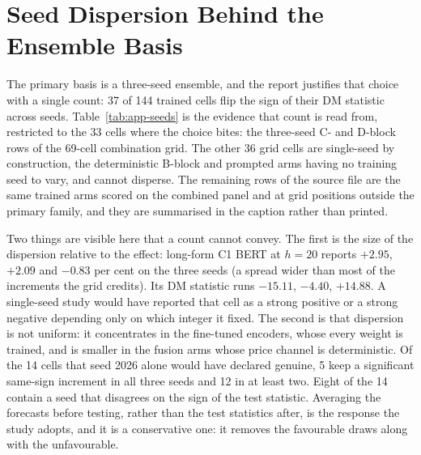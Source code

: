 \clearpage
\FloatBarrier
\section{Seed Dispersion Behind the Ensemble Basis}
\label{app:res-seeds}

The primary basis is a three-seed ensemble, and the report justifies that
choice with a single count: 37 of 144 trained cells flip the sign of their
DM statistic across seeds. Table~\ref{tab:app-seeds} is the evidence that
count is read from, restricted to the 33 cells where the choice bites:
the three-seed C- and D-block rows of the 69-cell combination grid. The
other 36 grid cells are single-seed by construction, the deterministic B-block and
prompted arms having no training seed to vary, and cannot disperse. The
remaining rows of the source file are the same trained arms scored on the
combined panel and at grid positions outside the primary family, and they
are summarised in the caption rather than printed.

Two things are visible here that a count cannot convey. The first is the
size of the dispersion relative to the effect: long-form C1 BERT at
$h{=}20$ reports $+2.95$, $+2.09$ and $-0.83$ per cent on the three seeds
(a spread wider than most of the increments the grid credits). Its
DM statistic runs $-15.11$, $-4.40$, $+14.88$. A single-seed study would
have reported that cell as a strong positive or a strong negative depending
only on which integer it fixed. The second is that dispersion is not
uniform: it concentrates in the fine-tuned encoders, whose every weight is
trained, and is smaller in the fusion arms whose price channel is
deterministic. Of the 14 cells that seed 2026 alone would have declared
genuine, 5 keep a significant same-sign increment in all three seeds and 12
in at least two. Eight of the 14 contain a seed that disagrees on the
sign of the test statistic. Averaging the forecasts before testing, rather
than the test statistics after, is the response the study adopts, and it is
a conservative one: it removes the favourable draws along with the
unfavourable.


